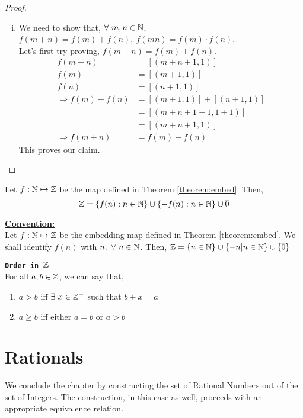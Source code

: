 \documentclass[11pt]{scrartcl}
\begin{document}
\begin{proof}
\begin{enumerate}[i)]
		\item We need to show that, $\forall\ m,n \in \mathbb N$, $f(m+n)= f(m)+f(n),\ f(mn) = f(m)\cdot f(n)$.\\
		Let's first try proving,  $f(m+n)= f(m)+f(n)$.
		\begin{align*}
			f(m+n) &= [(m+n+1,1)]\\
			f(m) &= [(m+1,1)]\\
			f(n) &= [(n+1, 1)]\\
			\Rightarrow f(m)+f(n) &= [(m+1,1)] + [(n+1, 1)]\\
			&= [(m+n+1+1,1+1)]\\
			&= [(m+n+1,1)]\\
			\Rightarrow f(m+n) &= f(m) + f(n)
		\end{align*}
	This proves our claim.
		\end{enumerate}
	\end{proof}

	\begin{corollary}
		Let $f: \mathbb N \mapsto \mathbb Z$ be the map defined in Theorem \ref{theorem:embed}. Then,
		$$\mathbb Z = \{f(n):n \in \mathbb N\} \cup \{-f(n):n \in \mathbb N\} \cup \overline{0}$$
	\end{corollary}
	\textbf{\underline{Convention: }}\\
 	Let $f: \mathbb N \mapsto \mathbb Z$ be the embedding map defined in Theorem \ref{theorem:embed}. We shall identify $f(n)$ with $n,\ \forall\ n \in \mathbb N$. Then, $\mathbb Z = \{n \in \mathbb N\} \cup \{-n|n \in \mathbb N\} \cup \{\overline{0}\}$
 	
 	\begin{theorem}
 		\texttt{\textbf{Order in $\mathbb Z$}}\\
 		For all $a,b \in \mathbb Z$, we can say that,
 		{\color{Red}
 		\begin{enumerate}
 			\item $a>b$ iff $\exists\ x\in \mathbb Z^{+}$ such that $b+x = a$
 			\item $a \geq b$ iff either $a=b$ or $a>b$
 		\end{enumerate}
 		}
 	\end{theorem}
 
 \section{Rationals}
 
 We conclude the chapter by constructing the set of Rational Numbers out of the set of Integers. The construction, in this case as well, proceeds with an appropriate equivalence relation.
 
\end{document}
